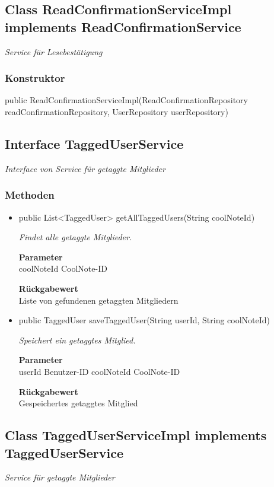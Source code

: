 \documentclass[a4paper]{scrreprt}
\begin{document}
        \subsection{Class ReadConfirmationServiceImpl implements ReadConfirmationService}
        \textit{Service für Lesebestätigung}
        \subsubsection{Konstruktor}
        public ReadConfirmationServiceImpl(ReadConfirmationRepository readConfirmationRepository, UserRepository userRepository)
        \subsection{Interface TaggedUserService}
        \textit{Interface von Service für getaggte Mitglieder}
        \subsubsection{Methoden}
        \begin{itemize}
        	\item{public List<TaggedUser> getAllTaggedUsers(String coolNoteId)}
        	
        	\textit{Findet alle getaggte Mitglieder.}
        	
        	\textbf{Parameter} \\
        	coolNoteId CoolNote-ID
        	
        	\textbf{Rückgabewert} \\
        	Liste von gefundenen getaggten Mitgliedern        \item{public TaggedUser saveTaggedUser(String userId, String coolNoteId)}
        	
        	\textit{Speichert ein getaggtes Mitglied.}
        	
        	\textbf{Parameter} \\
        	userId Benutzer-ID
        	coolNoteId CoolNote-ID
        	
        	\textbf{Rückgabewert} \\
        	Gespeichertes getaggtes Mitglied
        \end{itemize}
        \subsection{Class TaggedUserServiceImpl implements TaggedUserService}
        \textit{Service für getaggte Mitglieder}
\end{document}
